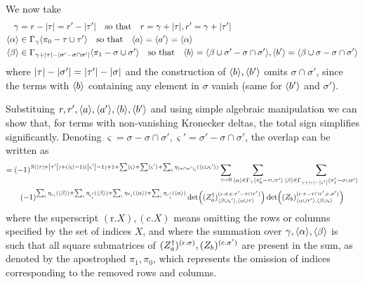 	We now take
	\begin{align}
	\gamma &= r - \abs{\tau} = r' - \abs{\tau'}\qq{so that}r=\gamma+\abs{\tau},r'=\gamma+\abs{\tau'}\\
	\seq{\alpha}&\in\Gamma_{\gamma}\seq{\pi_0-\tau\cup\tau'}\qq{so that}\seq{a}=\seq{a'}=\seq{\alpha}\\
	\seq{\beta}&\in\Gamma_{\gamma+\abs{\tau}-\abs{\sigma'-\sigma\cap\sigma'}}\seq{\pi_1-\sigma\cup\sigma'}\qq{so that}\seq{b}=\seq{\beta\cup\sigma' - \sigma\cap\sigma'},\seq{b'}=\seq{\beta\cup\sigma - \sigma\cap\sigma'}
	\end{align}
	where $\abs{\tau}-\abs{\sigma'}=\abs{\tau'}-\abs{\sigma}$ and the construction of $\langle b\rangle,\langle b'\rangle$ omits $\sigma\cap\sigma'$, since the terms with $\langle b\rangle$ containing any element in $\sigma$ vanish (same for $\langle b'\rangle$ and $\sigma'$).
	
	Substituing $r, r', \langle a\rangle,\langle a'\rangle, \langle b\rangle,\langle b'\rangle$ and using simple algebraic manipulation we can show that, for terms with non-vanishing Kronecker deltas, the total sign simplifies significantly. Denoting $\varsigma=\sigma-\sigma\cap\sigma',\varsigma'=\sigma'-\sigma\cap\sigma'$, the overlap can be written as
	\begin{multline}
	=(-1)^{S(\abs{\tau}+\abs{\tau'})+(\abs{\varsigma}-1)(\abs{\varsigma'}-1)+1+\sum\langle \varsigma\rangle+\sum\langle \varsigma'\rangle+\sum_i\eta_{(\sigma\cap\sigma')_i}(\langle \varsigma\cup\varsigma'\rangle)}\sum_{\gamma=0}\sum_{\langle \alpha\rangle\in\Gamma_{\gamma}\langle \pi'_0-\tau\cup\tau'\rangle}\sum_{\langle \beta\rangle\in\Gamma_{\gamma+\abs{\tau}-\abs{\varsigma'}}\langle \pi'_1-\sigma\cup\sigma'\rangle}\\
	(-1)^{\sum_i\eta_{\varsigma_i}(\langle \beta\rangle)+\sum_i\eta_{\varsigma'_i}(\langle \beta\rangle)+\sum_i\eta_{\tau_i}(\langle \alpha\rangle)+\sum_i\eta_{\tau'_i}(\langle \alpha\rangle)}\det((Z_a^\dagger)^{(\text{r.} \sigma, \text{c.} \tau'-\tau\cap\tau')}_{\langle \beta\cup\varsigma'\rangle, \langle \alpha\cup\tau\rangle})\det((Z_b)^{(\text{r.} \tau-\tau\cap\tau', \text{c.} \sigma')}_{\langle \alpha\cup\tau'\rangle,\langle \beta\cup\varsigma\rangle})
	\end{multline}
	where the superscript $(\text{r.} X), (\text{c.} X)$ means omitting the rows or columns specified by the set of indices $X$, and where the summation over $\gamma,\langle \alpha\rangle,\langle \beta\rangle$ is such that all square submatrices of $(Z_a^\dagger)^{(\text{r.} \sigma)},(Z_b)^{(\text{c.} \sigma')}$ are present in the sum, as denoted by the apostrophed $\pi_1,\pi_0$, which represents the omission of indices corresponding to the removed rows and columns.
	

